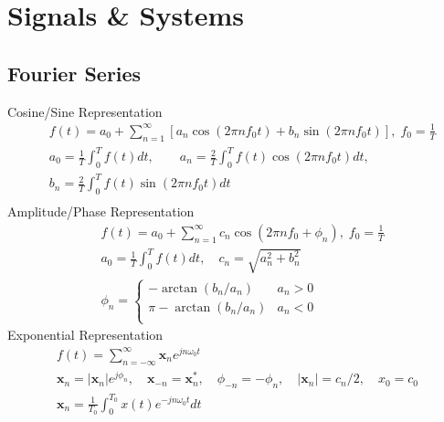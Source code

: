 \chapter{Signals \& Systems}

\section{Fourier Series}

Cosine/Sine Representation
\begin{align*}
&f(t) = a_0 + \sum_{n=1}^{\infty}\left[a_n \cos(2\pi nf_0 t) + b_n \sin(2\pi nf_0 t)\right],\; f_0 = \frac{1}{T}\\
&a_0 = \frac{1}{T}\int_{0}^{T}f(t)dt, \qquad a_n = \frac{2}{T}\int_{0}^{T}f(t)\cos(2\pi nf_0 t)dt,\\
&b_n = \frac{2}{T}\int_{0}^{T} f(t)\sin(2\pi nf_0 t)dt\\
\end{align*}
Amplitude/Phase Representation
\begin{align*}
&f(t) = a_0 + \sum_{n=1}^{\infty}c_n \cos(2\pi nf_0 + \phi_n),\; f_0 = \frac{1}{T}\\
&a_0 = \frac{1}{T}\int_{0}^{T}f(t)dt, \quad c_n = \sqrt{a_n^2 + b_n^2}\\
&\phi_n = \begin{cases}
-\arctan(b_n / a_n) & a_n > 0\\
\pi -\arctan(b_n / a_n) & a_n < 0\\
\end{cases}
\end{align*}
Exponential Representation
\begin{gather*}
f(t)=\sum_{n=-\infty}^{\infty}\mathbf{x}_n e^{jn\omega_0 t}\\
\mathbf{x}_n=\left|\mathbf{x}_n\right|e^{j\phi_n}, \quad \mathbf{x}_{-n}=\mathbf{x}_n^*, \quad \phi_{-n}=-\phi_n, \quad \left|\mathbf{x}_n\right|=c_n/2, \quad x_0=c_0 \\
\mathbf{x}_n=\frac{1}{T_0}\int_{0}^{T_0}x(t)e^{-jn\omega_0 t}dt
\end{gather*}



